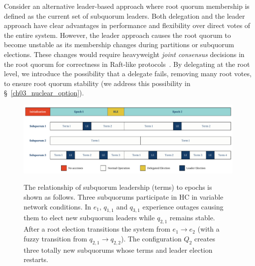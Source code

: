 Consider an alternative leader-based approach where root quorum membership is defined as the current set of subquorum leaders.
Both delegation and the leader approach have clear advantages in performance and flexibility over direct votes of the entire system.
However, the leader approach causes the root quorum to become unstable as its membership changes during partitions or subquorum elections.
These changes would require heavyweight \emph{joint consensus} decisions in the root quorum for correctness in Raft-like protocols~\cite{raft}.
By delegating at the root level, we introduce the possibility that a delegate fails, removing many root votes, to ensure root quorum stability (we address this possibility in \S~\ref{ch03_nuclear_option}).


\begin{landscape}
\begin{figure}
    \begin{center}
        \includegraphics[width=8.2in]{figures/ch03_epochs_terms.pdf}
    \end{center}
    \renewcommand{\baselinestretch}{1}
    \small\normalsize

    \begin{quote}
        \caption[Ordering of Epochs and Terms in Root and Subquorums]{The relationship of subquorum leadership (terms) to epochs is shown as follows. Three subquorums participate in HC in variable network conditions. In $e_1$, $q_{1,1}$ and $q_{3,1}$ experience outages causing them to elect new subquorum leaders while $q_{2,1}$ remains stable. After a root election transitions the system from $e_1 \rightarrow e_2$ (with a fuzzy transition from $q_{2,1} \rightarrow q_{2,2}$). The configuration $Q_2$ creates three totally new subquorums whose terms and leader election restarts.}
        \label{fig:ch03_epochs_terms}
    \end{quote}
\end{figure}
\renewcommand{\baselinestretch}{2}
\small\normalsize
\end{landscape}

